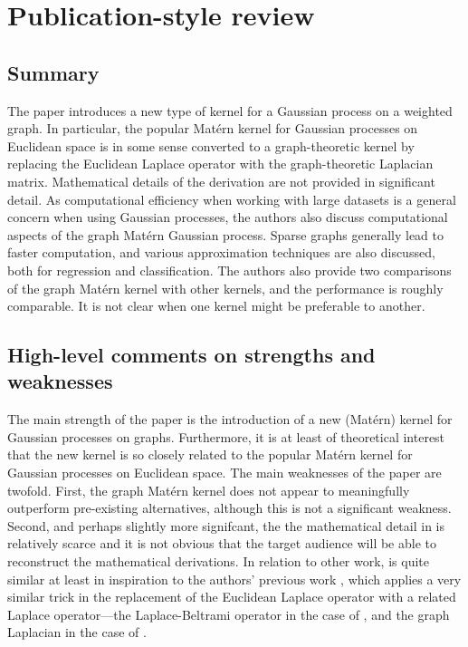 

\section{Publication-style review}

\subsection{Summary}

The paper \cite{pmlr-v130-borovitskiy21a} introduces a new type of kernel for a Gaussian process on a weighted graph. In particular, the popular Mat\'{e}rn kernel for Gaussian processes on Euclidean space is in some sense converted to a graph-theoretic kernel by replacing the Euclidean Laplace operator with the graph-theoretic Laplacian matrix. Mathematical details of the derivation are not provided in significant detail. As computational efficiency when working with large datasets is a general concern when using Gaussian processes, the authors also discuss computational aspects of the graph Mat\'{e}rn Gaussian process. Sparse graphs generally lead to faster computation, and various approximation techniques are also discussed, both for regression and classification. The authors also provide two comparisons of the graph Mat\'{e}rn kernel with other kernels, and the performance is roughly comparable. It is not clear when one kernel might be preferable to another.

\subsection{High-level comments on strengths and weaknesses}

The main strength of the paper is the introduction of a new (Mat\'{e}rn) kernel for Gaussian processes on graphs. Furthermore, it is at least of theoretical interest that the new kernel is so closely related to the popular Mat\'{e}rn kernel for Gaussian processes on Euclidean space. The main weaknesses of the paper are twofold. First, the graph Mat\'{e}rn kernel does not appear to meaningfully outperform pre-existing alternatives, although this is not a significant weakness. Second, and perhaps slightly more signifcant, the the mathematical detail in \cite{pmlr-v130-borovitskiy21a} is relatively scarce and it is not obvious that the target audience will be able to reconstruct the mathematical derivations. In relation to other work, \cite{pmlr-v130-borovitskiy21a} is quite similar at least in inspiration to the authors' previous work \cite{NEURIPS2020_92bf5e62}, which applies a very similar trick in the replacement of the Euclidean Laplace operator with a related Laplace operator---the Laplace-Beltrami operator in the case of \cite{NEURIPS2020_92bf5e62}, and the graph Laplacian in the case of \cite{pmlr-v130-borovitskiy21a}.

